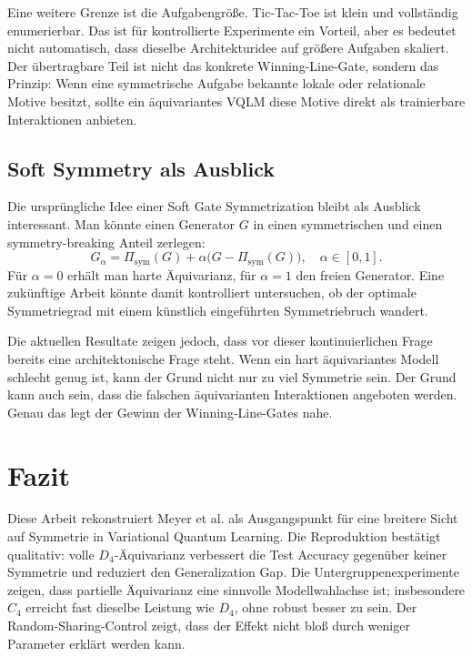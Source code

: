 Eine weitere Grenze ist die Aufgabengröße. Tic-Tac-Toe ist klein und vollständig enumerierbar. Das ist für kontrollierte Experimente ein Vorteil, aber es bedeutet nicht automatisch, dass dieselbe Architekturidee auf größere Aufgaben skaliert. Der übertragbare Teil ist nicht das konkrete Winning-Line-Gate, sondern das Prinzip: Wenn eine symmetrische Aufgabe bekannte lokale oder relationale Motive besitzt, sollte ein äquivariantes VQLM diese Motive direkt als trainierbare Interaktionen anbieten.

\subsection{Soft Symmetry als Ausblick}\label{subsec:soft}

Die ursprüngliche Idee einer Soft Gate Symmetrization bleibt als Ausblick interessant. Man könnte einen Generator $G$ in einen symmetrischen und einen symmetry-breaking Anteil zerlegen:
\begin{equation}
G_\alpha=\Pi_{\mathrm{sym}}(G)+\alpha\bigl(G-\Pi_{\mathrm{sym}}(G)\bigr),
\quad \alpha\in[0,1].
\label{eq:soft}
\end{equation}
Für $\alpha=0$ erhält man harte Äquivarianz, für $\alpha=1$ den freien Generator. Eine zukünftige Arbeit könnte damit kontrolliert untersuchen, ob der optimale Symmetriegrad mit einem künstlich eingeführten Symmetriebruch wandert.

Die aktuellen Resultate zeigen jedoch, dass vor dieser kontinuierlichen Frage bereits eine architektonische Frage steht. Wenn ein hart äquivariantes Modell schlecht genug ist, kann der Grund nicht nur zu viel Symmetrie sein. Der Grund kann auch sein, dass die falschen äquivarianten Interaktionen angeboten werden. Genau das legt der Gewinn der Winning-Line-Gates nahe.

\section{Fazit}\label{sec:fazit}

Diese Arbeit rekonstruiert Meyer et al. als Ausgangspunkt für eine breitere Sicht auf Symmetrie in Variational Quantum Learning. Die Reproduktion bestätigt qualitativ: volle $D_4$-Äquivarianz verbessert die Test Accuracy gegenüber keiner Symmetrie und reduziert den Generalization Gap. Die Untergruppenexperimente zeigen, dass partielle Äquivarianz eine sinnvolle Modellwahlachse ist; insbesondere $C_4$ erreicht fast dieselbe Leistung wie $D_4$, ohne robust besser zu sein. Der Random-Sharing-Control zeigt, dass der Effekt nicht bloß durch weniger Parameter erklärt werden kann.

